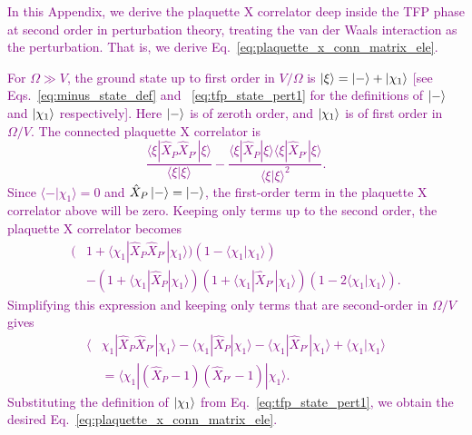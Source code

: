 \documentclass[twocolumn,superscriptaddress,amsmath,amssymb,aps,prx,nofootinbib]{revtex4-2}
\newcommand{\newtext}[1]{\textcolor{purple}{#1}}
\begin{document}
\newtext{In this Appendix, we derive  the plaquette X correlator deep inside the TFP phase at second order in perturbation theory, treating the van der Waals interaction as the perturbation. That is, we derive Eq.~\eqref{eq:plaquette_x_conn_matrix_ele}. }

\newtext{For $\Omega \gg V$, the ground state up to  first order in $V/\Omega$ is $\ket{\xi} = \ket{-} +\ket{\chi_1} $ [see Eqs.~\eqref{eq:minus_state_def} and ~\eqref{eq:tfp_state_pert1} for the definitions of $\ket{-}$ and $\ket{\chi_1}$ respectively]. Here $\ket{-}$ is of zeroth order, and $\ket{\chi_1}$ is of first order in $\Omega/V$.  The connected plaquette X correlator is
\begin{equation}
    \frac{\langle \xi | \hat{X}_P \hat{X}_{P'}| \xi \rangle}{\langle \xi | \xi \rangle} -    \frac{\langle \xi | \hat{X}_P | \xi \rangle\langle \xi | \hat{X}_{P'} | \xi \rangle}{\langle \xi | \xi \rangle^2}.    
\end{equation}
Since $\langle - | \chi_1 \rangle = 0$ and $\hat{X}_P \ket{-} = \ket{-}$, the first-order term in the plaquette X correlator above will be zero. Keeping only terms up to the second order, the plaquette X correlator becomes
\begin{equation}
\begin{aligned}
    (&1+\langle \chi_1 | \hat{X}_{P}\hat{X}_{P'} | \chi_1 \rangle )( 1- \langle \chi_1 | \chi_1 \rangle )\\
    & - (1+\langle \chi_1 | \hat{X}_P | \chi_1\rangle ) (1+\langle \chi_1 | \hat{X}_{P'} | \chi_1\rangle ) (1-2\langle \chi_1 | \chi_1\rangle ). 
    \end{aligned}
\end{equation}
Simplifying this expression and keeping only terms that are second-order in $\Omega/V$ gives
\begin{equation}
\begin{aligned}
    \langle &\chi_1 | \hat{X}_{P}\hat{X}_{P'} | \chi_1 \rangle - \langle \chi_1 | \hat{X}_{P}| \chi_1 \rangle - \langle \chi_1 | \hat{X}_{P'} | \chi_1 \rangle + \langle \chi_1 | \chi_1 \rangle\\
    &= \langle \chi_1 | (\hat{X}_P - 1) (\hat{X}_{P'} - 1) | \chi_1 \rangle.
\end{aligned}
\end{equation}
Substituting the definition of $\ket{\chi_1}$ from Eq.~\eqref{eq:tfp_state_pert1}, we obtain the desired Eq.~\eqref{eq:plaquette_x_conn_matrix_ele}.
}
\end{document}
